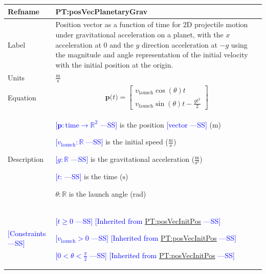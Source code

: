 \documentclass[12pt]{article}
\newcommand{\authornote}[3]{\textcolor{#1}{[#3 ---#2]}}
\newcommand{\authornote}[3]{}
\newcommand{\wss}[1]{\authornote{blue}{SS}{#1}}
\begin{document}
\noindent \begin{minipage}{\textwidth}
\begin{tabular}{>{\raggedright}p{}>{\raggedright\arraybackslash}p{}}
\toprule \textbf{Refname} & \textbf{PT:posVecPlanetaryGrav} 
\label{PT:posVecPlanetaryGrav} \\ \midrule Label & Position vector as a function
of time for 2D projectile motion under gravitational acceleration on a planet,
with the $x$ acceleration at 0 and the $y$ direction acceleration at $-g$ using
the magnitude and angle representation of the initial velocity with the initial
position at the origin.
        
\\ \midrule
Units & $\frac{\text{m}}{\text{s}}$
        
\\ \midrule
Equation & \begin{displaymath}
           \symbf{p}\text{(}t\text{)}=\begin{bmatrix}
                                      {v}_{\text{launch}} \cos(\theta) t \\
                                      {v}_{\text{launch}} \sin(\theta) t - \frac{g t^2}{2}
                                      \end{bmatrix}
           \end{displaymath}
\\ \midrule
Description & \begin{symbDescription}
              \item{\wss{$\symbf{p}: \text{time} \rightarrow \mathbb{R}^2$} is the position \wss{vector} (${\text{m}}$)}
              \item{\wss{${{v}_{\text{launch}}}: \mathbb{R}$} is the initial speed ($\frac{\text{m}}{\text{s}}$)}
              \item{\wss{$g: \mathbb{R}$} is the gravitational acceleration ($\frac{\text{m}}{\text{s}^{2}}$)}
              \item{\wss{$t$: \text{time}} is the time (${\text{s}}$)}
              \item $\theta: \mathbb{R}$ is the launch angle (rad)
              \end{symbDescription}

\\ \midrule
\wss{Constraints} & 
\begin{symbDescription}
\item \wss{$t \geq 0$} \wss{Inherited from \hyperref[PT:posVecInitPos]{PT:posVecInitPos}}
\item \wss{$v_\text{launch} > 0$} \wss{Inherited from \hyperref[PT:posVecInitPos]{PT:posVecInitPos}}
\item \wss{$
0 < \theta < \frac{\pi}{2}$} \wss{Inherited from \hyperref[PT:posVecInitPos]{PT:posVecInitPos}}
\end{symbDescription}


\end{tabular}
\end{minipage}
\end{document}
